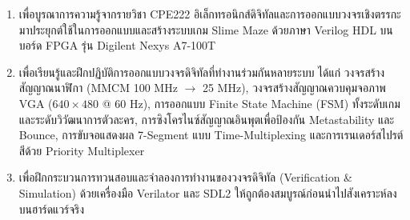 
\begin{enumerate}[leftmargin=1.5cm]
    \item เพื่อบูรณาการความรู้จากรายวิชา CPE222 อิเล็กทรอนิกส์ดิจิทัลและการออกแบบวงจรเชิงตรรกะ มาประยุกต์ใช้ในการออกแบบและสร้างระบบเกม Slime Maze ด้วยภาษา Verilog HDL บนบอร์ด FPGA รุ่น Digilent Nexys A7-100T
    \item เพื่อเรียนรู้และฝึกปฏิบัติการออกแบบวงจรดิจิทัลที่ทำงานร่วมกันหลายระบบ ได้แก่ วงจรสร้างสัญญาณนาฬิกา (MMCM 100 MHz $\rightarrow$ 25 MHz), วงจรสร้างสัญญาณควบคุมจอภาพ VGA ($640\times480$ @ 60 Hz), การออกแบบ Finite State Machine (FSM) ทั้งระดับเกมและระดับวิวัฒนาการตัวละคร, การซิงโครไนซ์สัญญาณอินพุตเพื่อป้องกัน Metastability และ Bounce, การขับจอแสดงผล 7-Segment แบบ Time-Multiplexing และการเรนเดอร์สไปรต์สีด้วย Priority Multiplexer
    \item เพื่อฝึกกระบวนการทวนสอบและจำลองการทำงานของวงจรดิจิทัล (Verification \& Simulation) ด้วยเครื่องมือ Verilator และ SDL2 ให้ถูกต้องสมบูรณ์ก่อนนำไปสังเคราะห์ลงบนฮาร์ดแวร์จริง
\end{enumerate}
